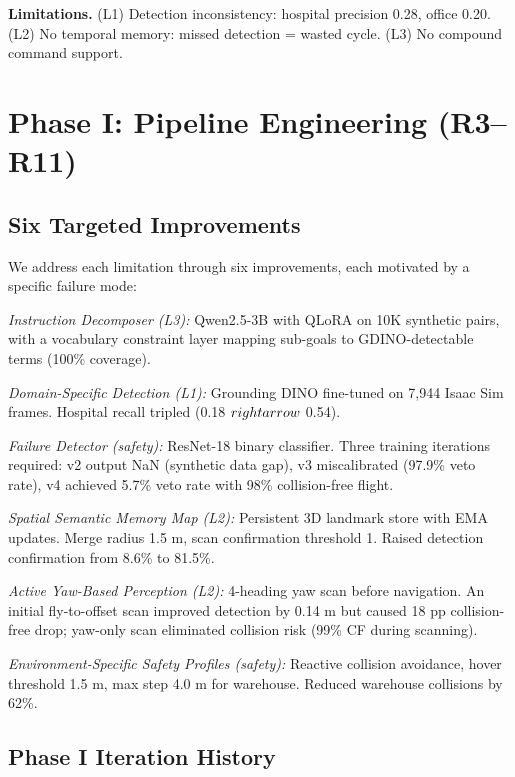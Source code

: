 \documentclass[conference]{IEEEtran}
\begin{document}
\textbf{Limitations.} (L1) Detection inconsistency: hospital precision
0.28, office 0.20. (L2) No temporal memory: missed detection = wasted
cycle. (L3) No compound command support.

\section{Phase I: Pipeline Engineering (R3--R11)}\label{iv.-phase-i-pipeline-engineering-r3r11}

\subsection{Six Targeted Improvements}\label{a.-six-targeted-improvements}

We address each limitation through six improvements, each motivated by a
specific failure mode:

\emph{Instruction Decomposer (L3):} Qwen2.5-3B with QLoRA on 10K
synthetic pairs, with a vocabulary constraint layer mapping sub-goals to
GDINO-detectable terms (100\% coverage).

\emph{Domain-Specific Detection (L1):} Grounding DINO fine-tuned on
7,944 Isaac Sim frames. Hospital recall tripled (0.18 $\\rightarrow$ 0.54).

\emph{Failure Detector (safety):} ResNet-18 binary classifier. Three
training iterations required: v2 output NaN (synthetic data gap), v3
miscalibrated (97.9\% veto rate), v4 achieved 5.7\% veto rate with 98\%
collision-free flight.

\emph{Spatial Semantic Memory Map (L2):} Persistent 3D landmark store
with EMA updates. Merge radius 1.5 m, scan confirmation threshold 1.
Raised detection confirmation from 8.6\% to 81.5\%.

\emph{Active Yaw-Based Perception (L2):} 4-heading yaw scan before
navigation. An initial fly-to-offset scan improved detection by 0.14 m
but caused 18 pp collision-free drop; yaw-only scan eliminated collision
risk (99\% CF during scanning).

\emph{Environment-Specific Safety Profiles (safety):} Reactive collision
avoidance, hover threshold 1.5 m, max step 4.0 m for warehouse. Reduced
warehouse collisions by 62\%.

\subsection{Phase I Iteration History}\label{b.-phase-i-iteration-history}
\end{document}
